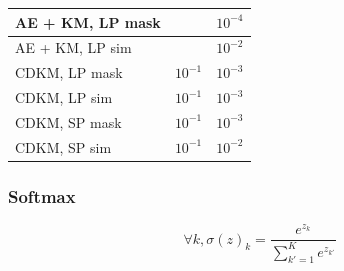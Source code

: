 \documentclass{beamer}
\begin{document}
\begin{frame}
\begin{table}
{\begin{tabular}{|l|l|l|}
    AE + KM, LP mask  &\cellcolor{gray}  &$10^{-4}$         \\ \hline
    AE + KM, LP sim   &\cellcolor{gray} &$10^{-2}$         \\ \hline
       CDKM, LP mask  &$10^{-1}$  &$10^{-3}$         \\ \hline
       CDKM, LP sim   &$10^{-1}$  &$10^{-3}$         \\ \hline
       CDKM, SP mask  &$10^{-1}$  &$10^{-3}$         \\ \hline
       CDKM, SP sim   &$10^{-1}$  &$10^{-2}$         \\ \hline
\end{tabular}
}
\end{table}
\end{frame}

\begin{frame}
  \frametitle{Softmax}
  \begin{equation*}\label{eq:general_softmax}
    \forall k, \sigma(z)_k = \frac{e^{z_k}}{\sum_{{k'}=1}^Ke^{z_{k'}}}
  \end{equation*}
\end{frame}
\end{document}
